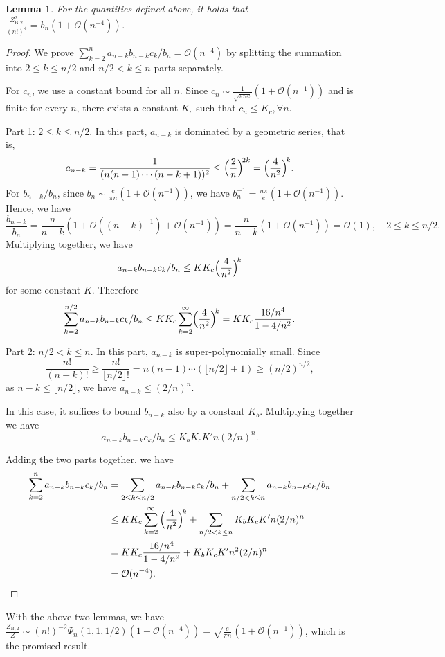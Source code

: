 \documentclass[conference]{IEEEtran}
\theoremstyle{plain}
\newtheorem{lem}[thm]{Lemma}
\theoremstyle{definition}
\begin{document}
 \begin{lem}
  For the quantities defined above, it holds that $\frac{Z_{\mathrm B,2}^2}{(n!)^4}= b_n(1+\mathcal O(n^{-4}))$.
 \end{lem}
 \begin{proof}
  We prove $\sum_{k=2}^{n}a_{n-k}b_{n-k}c_k/b_n=\mathcal O(n^{-4})$ by splitting the summation
  into $2\leq k\leq n/2$ and $n/2 <k\leq n$ parts separately.

  For $c_n$, we use a constant bound for all $n$. Since
  $c_n\sim\frac{1}{\sqrt{\pi ne}}(1+\mathcal O(n^{-1}))$ and is finite for
  every $n$, there exists a constant $K_c$ such that $c_n\leq K_c,\forall n$.

  Part 1: $2\leq k\leq n/2$. In this part, $a_{n-k}$ is dominated by a
  geometric series, that is,
  \[a_{n-k}=\frac{1}{(n(n-1)\cdots(n-k+1))^2}\leq \Big(\frac{2}{n}\Big)^{\! 2k}
   =\Bigl(\frac{4}{n^2}\Bigr)^{\! k}.\]
  For $b_{n-k}/b_n$, since $b_n\sim\frac{e}{\pi n}(1+\mathcal O(n^{-1}))$, we
  have $b^{-1}_n=\frac{n\pi}{e}(1+\mathcal O(n^{-1}))$. Hence, we have
  \[
   \frac{b_{n-k}}{b_n}
   =\frac{n}{n-k}(1+\mathcal O((n-k)^{-1})+\mathcal O (n^{-1}))
   =\frac{n}{n-k}(1+\mathcal O (n^{-1}))
   =\mathcal O(1),\quad 2\leq k\leq n/2.
  \]
  Multiplying together, we have
  \[a_{n-k}b_{n-k}c_k/b_n \leq KK_c \Bigl(\frac{4}{n^2}\Bigr)^{\! k}\]
  for some constant $K$. Therefore
  \[
   \sum_{k=2}^{n/2}a_{n-k}b_{n-k}c_k/b_n
   \leq KK_c\sum_{k=2}^\infty \Bigl(\frac{4}{n^2}\Bigr)^{\! k}
   = KK_c\frac{16/n^4}{1-4/n^2}.
  \]

  Part 2: $n/2 <k\leq n$. In this part, $a_{n-k}$ is super-polynomially small.
  Since
  \[
   \frac{n!}{(n-k)!}\geq\frac{n!}{\lfloor n/2 \rfloor!}= n(n-1)\cdots(\lfloor n/2\rfloor+1)\geq (n/2)^{n/2},
  \]
  as $n-k\leq\lfloor n/2 \rfloor$, we have $a_{n-k}\leq(2/n)^n$.

  In this case, it suffices to bound $b_{n-k}$ also by a constant $K_b$.
  Multiplying together we have
  \[a_{n-k}b_{n-k}c_k/b_n \leq K_bK_cK'n(2/n)^n.\]

  Adding the two parts together, we have
  \begin{align*}
   \sum_{k=2}^{n}a_{n-k}b_{n-k}c_k/b_n
    & = \sum_{2\leq k\leq n/2}a_{n-k}b_{n-k}c_k/b_n+\sum_{n/2< k\leq n}a_{n-k}b_{n-k}c_k/b_n            \\
    & \leq  KK_c\sum_{k=2}^\infty \Big(\frac{4}{n^2}\Big)^{\! k} + \sum_{n/2< k\leq n} K_bK_cK'n(2/n)^n \\
    & =KK_c\frac{16/n^4}{1-4/n^2}+K_bK_cK'n^2(2/n)^n                                                    \\
    & = \mathcal O(n^{-4}). \qedhere
  \end{align*}
 \end{proof}
 With the above two lemmas, we have $\frac{Z_{\mathrm B,2}}{Z}\sim (n!)^{-2}\Psi_n(1,1,1/2)(1+\mathcal O(n^{-4}))=\sqrt{\frac{e}{\pi n}}(1+\mathcal O(n^{-1}))$, which is the promised result.
\end{document}
